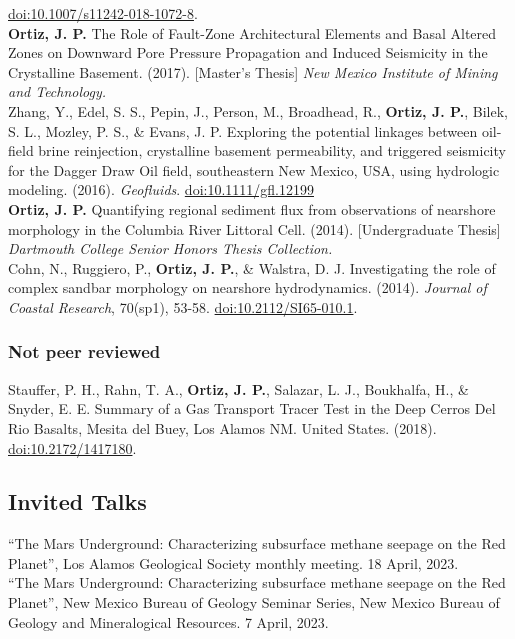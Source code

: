 \documentclass[11pt, letterpaper]{article}
\newcommand{\years}[1]{\marginnote{\scriptsize #1}}
\begin{document}
\href{https://link.springer.com/content/pdf/10.1007/s11242-018-1072-8.pdf}{doi:10.1007/s11242-018-1072-8}.
\TransportinPorousMedOOOOImmobileporewatersto\\ 
%
\years{2017}\textbf{Ortiz, J. P.} The Role of Fault-Zone Architectural Elements
and Basal Altered Zones on Downward Pore Pressure Propagation and Induced
Seismicity in the Crystalline Basement. (2017). [Master's Thesis] \emph{New
Mexico Institute of Mining and Technology.}
\NewMexicoInstituteofOOOOTheRoleofFaultZoneAr\\ 
%
\years{2016}Zhang, Y., Edel, S. S., Pepin, J., Person, M., Broadhead, R.,
\textbf{Ortiz, J. P.}, Bilek, S. L., Mozley, P. S., \& Evans, J.  P. Exploring
the potential linkages between oil-field brine reinjection, crystalline
basement permeability, and triggered seismicity for the Dagger Draw Oil field,
southeastern New Mexico, USA, using hydrologic modeling. (2016). \emph{Geofluids}.
\href{https://onlinelibrary.wiley.com/doi/epdf/10.1111/gfl.12199}{doi:10.1111/gfl.12199}
\GeofluidsOOOOExploringthepotentia\\
%
\years{2014}\textbf{Ortiz, J. P.} Quantifying regional sediment flux from
observations of nearshore morphology in the Columbia River Littoral Cell.
(2014). [Undergraduate Thesis] \emph{Dartmouth College Senior Honors Thesis
Collection.}\\ 
%
\years{2014}Cohn, N., Ruggiero, P., \textbf{Ortiz, J. P.}, \& Walstra, D. J.
Investigating the role of complex sandbar morphology on nearshore
hydrodynamics. (2014). \emph{Journal of Coastal Research}, 70(sp1), 53-58.
\href{https://bioone.org/journalArticle/Download?urlId=10.2112%2FSI65-010.1}{doi:10.2112/SI65-010.1}.
\JournalofCoastalReseOOOOInvestigatingtherole

\subsubsection*{Not peer reviewed}
%
\years{2018}Stauffer, P. H., Rahn, T. A., \textbf{Ortiz, J. P.}, Salazar, L.
J., Boukhalfa, H., \& Snyder, E. E. Summary of a Gas Transport Tracer Test in
the Deep Cerros Del Rio Basalts, Mesita del Buey, Los Alamos NM. United States.
(2018). \href{https://www.osti.gov/servlets/purl/1417180}{doi:10.2172/1417180}.
\LosAlamosNationalLabOOOOSummaryofaGasTranspo\\
%

\hypersetup{linkcolor=black,citecolor=blue,filecolor=black,urlcolor=blue} 


\subsection*{Invited Talks}
\label{sec:invitedTalks}
\years{2023} ``The Mars Underground: Characterizing subsurface methane seepage
on the Red Planet'', Los Alamos Geological Society monthly meeting. 18 April,
2023.\\ 
%
\years{2023} ``The Mars Underground: Characterizing subsurface methane seepage
on the Red Planet'', New Mexico Bureau of Geology Seminar Series, New
Mexico Bureau of Geology and Mineralogical Resources. 7 April, 2023.\\
%
\end{document}
